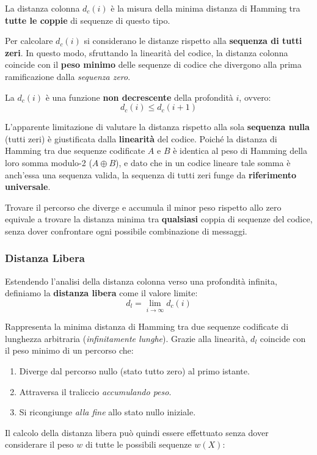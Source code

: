 La distanza colonna $d_c(i)$ è la misura della minima distanza di Hamming tra \textbf{tutte le coppie} di sequenze di questo tipo.

Per calcolare $d_c(i)$ si considerano le distanze rispetto alla \textbf{sequenza di tutti zeri}. In questo modo, sfruttando la linearità del codice, la distanza colonna coincide con il \textbf{peso minimo} delle sequenze di codice che divergono alla prima ramificazione dalla \textit{sequenza zero}.

La $d_c(i)$ è una funzione \textbf{non decrescente} della profondità $i$, ovvero:
$$ d_c(i) \le d_c(i+1)$$

L'apparente limitazione di valutare la distanza rispetto alla sola \textbf{sequenza nulla} (tutti zeri) è giustificata dalla \textbf{linearità} del codice. Poiché la distanza di Hamming tra due sequenze codificate $A$ e $B$ è identica al peso di Hamming della loro somma modulo-2 ($A \oplus B$), e dato che in un codice lineare tale somma è anch'essa una sequenza valida, la sequenza di tutti zeri funge da \textbf{riferimento universale}. 

Trovare il percorso che diverge e accumula il minor peso rispetto allo zero equivale a trovare la distanza minima tra \textbf{qualsiasi} coppia di sequenze del codice, senza dover confrontare ogni possibile combinazione di messaggi.

\subsubsection{Distanza Libera}
Estendendo l'analisi della distanza colonna verso una profondità infinita, definiamo la \textbf{distanza libera} come il valore limite:
\[ d_l = \lim_{i \to \infty} d_c(i) \]

Rappresenta la minima distanza di Hamming tra due sequenze codificate di lunghezza arbitraria (\textit{infinitamente lunghe}). Grazie alla linearità, $d_l$ coincide con il peso minimo di un percorso che:
\begin{enumerate}
    \item Diverge dal percorso nullo (stato tutto zero) al primo istante.
    \item Attraversa il traliccio \textit{accumulando peso}.
    \item Si ricongiunge \textit{alla fine} allo stato nullo iniziale.
\end{enumerate}


Il calcolo della distanza libera può quindi essere effettuato senza dover considerare il peso $w$ di tutte le possibili sequenze $w(X)$:


